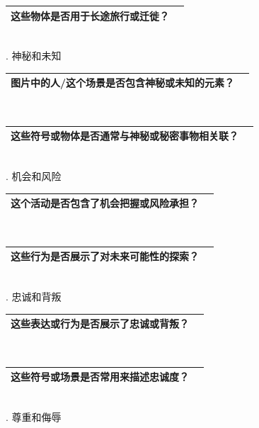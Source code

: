 \documentclass[12pt]{book}
\begin{document}
\begin{tabular}{|p{15cm}|p{3cm}|}
	\hline
这些物体是否用于长途旅行或迁徙？\\
	\hline
\end{tabular}\\



. 神秘和未知

\begin{tabular}{|p{15cm}|p{3cm}|}
	\hline
	图片中的人/这个场景是否包含神秘或未知的元素？\\
	\hline
\end{tabular}\\



\begin{tabular}{|p{15cm}|p{3cm}|}
	\hline
这些符号或物体是否通常与神秘或秘密事物相关联？\\
	\hline
\end{tabular}\\



. 机会和风险

\begin{tabular}{|p{15cm}|p{3cm}|}
	\hline
这个活动是否包含了机会把握或风险承担？\\
	\hline
\end{tabular}\\


\begin{tabular}{|p{15cm}|p{3cm}|}
	\hline
这些行为是否展示了对未来可能性的探索？\\
	\hline
\end{tabular}\\


. 忠诚和背叛

\begin{tabular}{|p{15cm}|p{3cm}|}
	\hline
这些表达或行为是否展示了忠诚或背叛？\\
	\hline
\end{tabular}\\



\begin{tabular}{|p{15cm}|p{3cm}|}
	\hline
这些符号或场景是否常用来描述忠诚度？\\
	\hline
\end{tabular}\\




. 尊重和侮辱
\end{document}
